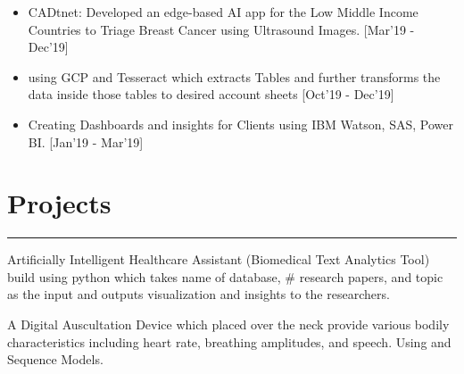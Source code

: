 \documentclass[]{rahulworld-resume}
\begin{document}
\begin{minipage}[t]{0.66\textwidth}
 
\hspace{5em}
\begin{minipage}{1.00\textwidth\vspace{2pt}}
\begin{itemize}
  \setlength{\itemsep}{0.2pt}
  \item {}CADtnet: Developed an edge-based AI app for the Low Middle Income Countries to Triage Breast Cancer using Ultrasound Images.              [Mar'19 - Dec'19]
  \item {}using GCP and Tesseract which extracts Tables and further transforms the data inside those tables to desired account sheets              [Oct'19 - Dec'19]
  \item Creating Dashboards and insights for Clients using IBM Watson, SAS, Power BI.          [Jan'19 - Mar'19]
\end{itemize}
\end{minipage}
\sectionsep

\section{Projects}
\noindent\rule{12.5cm}{0.4pt}   
\noindent
\hspace{1em}%
\begin{minipage}{0.95\textwidth\vspace{5pt}}
Artificially Intelligent Healthcare Assistant (Biomedical Text Analytics Tool) build using python which takes name of database, # research papers, and topic as the input and outputs visualization and insights to the researchers.
\end{minipage}


\noindent
\hspace{1em}%
\begin{minipage}{0.95\textwidth\vspace{5pt}}
A Digital Auscultation Device which placed over the neck provide various bodily characteristics including heart rate, breathing amplitudes, and speech. Using  and Sequence Models.
\end{minipage}


\end{minipage}
\end{document}

